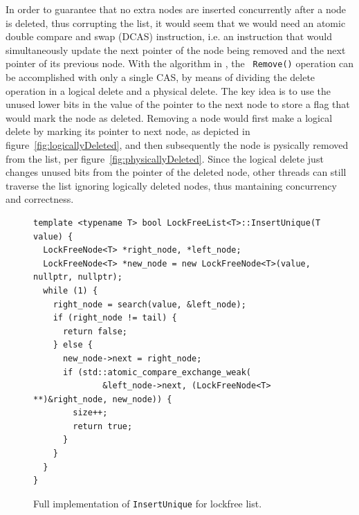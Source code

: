 \documentclass[11pt]{article}
\begin{document}
In order to guarantee that no extra nodes are inserted concurrently after a node is
deleted, thus corrupting the list, it would seem that we would need an atomic
double compare and swap (DCAS) instruction, i.e. an instruction that would
simultaneously update the next pointer of the node being removed and the next
pointer of its previous node. With the algorithm in \cite{Harris}, the {\tt
Remove()} operation can be accomplished with only a single CAS, by means of
dividing the delete operation in a logical delete and a physical delete. The key
idea is to use the unused lower bits in the value of the pointer to the next
node to store a flag that would mark the node as deleted. Removing a node would
first make a logical delete by marking its pointer to next node, as depicted in
figure~\ref{fig:logicallyDeleted}, and then subsequently the node is
pysically removed from the list, per figure~\ref{fig:physicallyDeleted}. Since
the logical delete just changes unused bits from the pointer of the deleted
node, other threads can still traverse the list ignoring logically deleted
nodes, thus mantaining concurrency and correctness.



\begin{figure}[h]
\begin{center}
\begin{lstlisting}
template <typename T> bool LockFreeList<T>::InsertUnique(T value) {
  LockFreeNode<T> *right_node, *left_node;
  LockFreeNode<T> *new_node = new LockFreeNode<T>(value, nullptr, nullptr);
  while (1) {
    right_node = search(value, &left_node);
    if (right_node != tail) {
      return false;
    } else {
      new_node->next = right_node;
      if (std::atomic_compare_exchange_weak(
              &left_node->next, (LockFreeNode<T> **)&right_node, new_node)) {
        size++;
        return true;
      }
    }
  }
}
\end{lstlisting}
\caption{Full implementation of {\tt InsertUnique} for lockfree list.}
\label{fig:lockfreeIUnique}
\end{center}
\end{figure}
\end{document}
